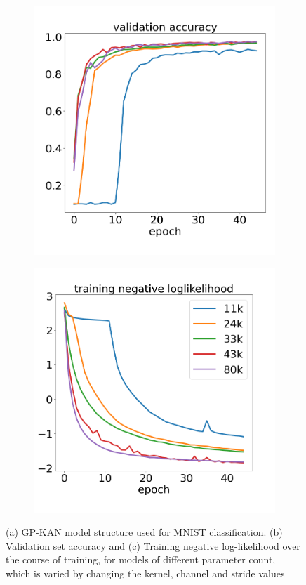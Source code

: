 \documentclass{article}
\begin{document}
\begin{figure}[h]
\begin{subfigure}[b]{0.3\columnwidth}
        \includegraphics[width=\textwidth]{MNIST_model_acc.png}
        \caption{}
    \end{subfigure}
    \begin{subfigure}[b]{0.3\columnwidth}
        \includegraphics[width=\textwidth]{MNIST_model_training.png}
        \caption{}
    \end{subfigure}
    \caption{(a) GP-KAN model structure used for MNIST classification. (b) Validation set accuracy and (c) Training negative log-likelihood over the course of training, for models of different parameter count, which is varied by changing the kernel, channel and stride values}
    \label{fig:MNIST_model}
\end{figure}
\end{document}
